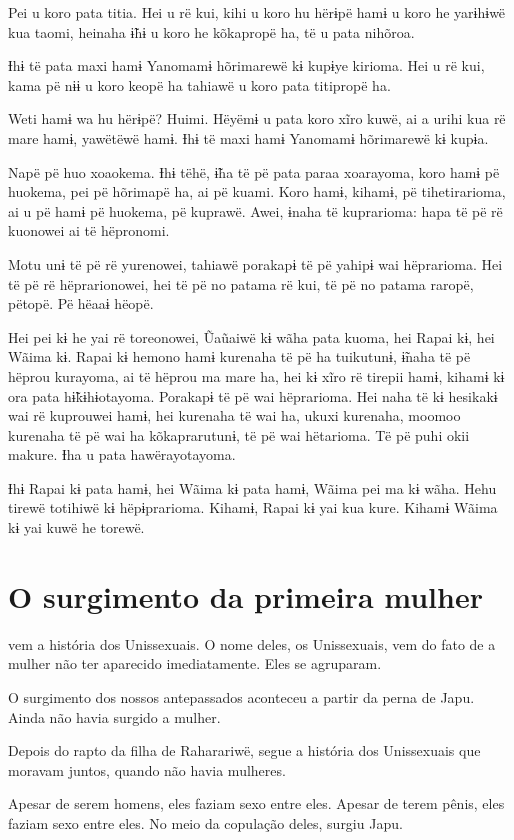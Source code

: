 Pei u koro pata titia. Hei u rë kui, kihi u koro hu hërɨpë hamɨ u koro
he yarɨhɨwë kua taomi, heinaha ɨ̃hɨ u koro he kõkapropë ha, të u pata
nihõroa. 

Ɨhɨ të pata maxi hamɨ Yanomamɨ hõrimarewë kɨ kupɨye kirioma. Hei u rë
kui, kama pë nɨɨ u koro keopë ha tahiawë u koro pata titipropë ha. 

Weti hamɨ wa hu hërɨpë? Huimi. Hëyëmɨ u pata koro xĩro kuwë, ai a urihi
kua rë mare hamɨ, yawëtëwë hamɨ. Ɨhɨ të maxi hamɨ Yanomamɨ hõrimarewë kɨ
kupɨa. 

Napë pë huo xoaokema. Ɨhɨ tëhë, ɨ̃ha të pë pata paraa xoarayoma, koro
hamɨ pë huokema, pei pë hõrimapë ha, ai pë kuami. Koro hamɨ, kihamɨ, pë
tihetirarioma, ai u pë hamɨ pë huokema, pë kuprawë. Awei, ɨnaha të
kuprarioma: hapa të pë rë kuonowei ai të hëpronomi. 

Motu unɨ të pë rë yurenowei, tahiawë porakapɨ të pë yahipɨ wai
hëprarioma. Hei të pë rë hëprarionowei, hei të pë no patama rë kui, të
pë no patama raropë, pëtopë. Pë hëaaɨ hëopë. 

Hei pei kɨ he yai rë toreonowei, Ũaũaiwë kɨ wãha pata kuoma, hei Rapai
kɨ, hei Wãima kɨ. Rapai kɨ hemono hamɨ kurenaha të pë ha tuikutunɨ,
ɨ̃naha të pë hëprou kurayoma, ai të hëprou ma mare ha, hei kɨ xĩro rë
tirepii hamɨ, kihamɨ kɨ ora pata hɨ̃kɨhɨotayoma. Porakapɨ të pë wai
hëprarioma. Hei naha të kɨ hesikakɨ wai rë kuprouwei hamɨ, hei kurenaha
të wai ha, ukuxi kurenaha, moomoo kurenaha të pë wai ha kõkaprarutunɨ,
të pë wai hëtarioma. Të pë puhi okii makure. Ɨha u pata hawërayotayoma.

Ɨhɨ Rapai kɨ pata hamɨ, hei Wãima kɨ pata hamɨ, Wãima pei ma kɨ wãha.
Hehu tirewë totihiwë kɨ hëpɨprarioma. Kihamɨ, Rapai kɨ yai kua kure.
Kihamɨ Wãima kɨ yai kuwë he torewë. 

\chapter{O surgimento da primeira mulher}
 
 vem a história dos Unissexuais. O nome deles, os Unissexuais, vem
do fato de a mulher não ter aparecido imediatamente. Eles se agruparam. 

O surgimento dos nossos antepassados aconteceu a partir da perna de
Japu. Ainda não havia surgido a mulher. 

Depois do rapto da filha de Raharariwë, segue a história dos Unissexuais
que moravam juntos, quando não havia mulheres. 

Apesar de serem homens, eles faziam sexo entre eles. Apesar de terem
pênis, eles faziam sexo entre eles. No meio da copulação
deles, surgiu Japu. 

